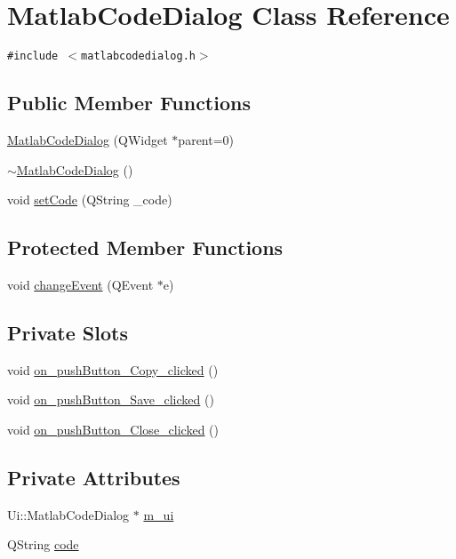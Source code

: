 \hypertarget{class_matlab_code_dialog}{
\section{MatlabCodeDialog Class Reference}
\label{class_matlab_code_dialog}
}
{\tt \#include $<$matlabcodedialog.h$>$}

\subsection*{Public Member Functions}
\begin{CompactItemize}
\item 
\hyperlink{class_matlab_code_dialog_c8f426b6c0d5a18f007d9bcd25bac51e}{MatlabCodeDialog} (QWidget $\ast$parent=0)
\item 
\hyperlink{class_matlab_code_dialog_a6c34fec5d8fb8785ac7cac54eb5956b}{$\sim$MatlabCodeDialog} ()
\item 
void \hyperlink{class_matlab_code_dialog_f98746af9478794fb531433d1d71e49e}{setCode} (QString \_\-code)
\end{CompactItemize}
\subsection*{Protected Member Functions}
\begin{CompactItemize}
\item 
void \hyperlink{class_matlab_code_dialog_1bf85b91350be2d1afcd427d7b473591}{changeEvent} (QEvent $\ast$e)
\end{CompactItemize}
\subsection*{Private Slots}
\begin{CompactItemize}
\item 
void \hyperlink{class_matlab_code_dialog_e09e39d39463a89b053873b69f8d17d6}{on\_\-pushButton\_\-Copy\_\-clicked} ()
\item 
void \hyperlink{class_matlab_code_dialog_d9cbd8464303a8fc08a85d8f5c0a6259}{on\_\-pushButton\_\-Save\_\-clicked} ()
\item 
void \hyperlink{class_matlab_code_dialog_def9f0ceedb03979b45a05321a944866}{on\_\-pushButton\_\-Close\_\-clicked} ()
\end{CompactItemize}
\subsection*{Private Attributes}
\begin{CompactItemize}
\item 
Ui::MatlabCodeDialog $\ast$ \hyperlink{class_matlab_code_dialog_37010744fc03886b3a052d2a655ce90a}{m\_\-ui}
\item 
QString \hyperlink{class_matlab_code_dialog_56cc3f80d70000fe5979f8439b628afb}{code}
\end{CompactItemize}


